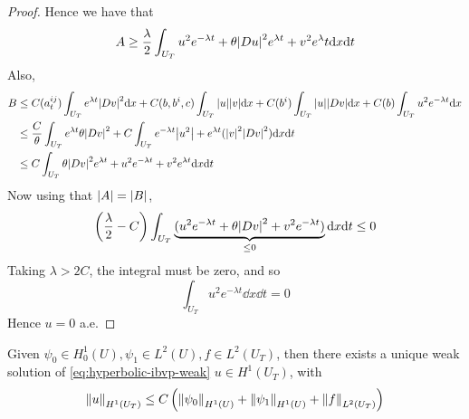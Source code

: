 \documentclass{article}
\begin{document}
\begin{proof}
    Hence we have that
    \[A \ge \frac{\lambda}{2}\int_{U_T}u^2e^{-\lambda t} + \theta \abs{Du}^2 e^{\lambda t} + v^2e^\lambda t \dd x \dd t\]
    Also,
    \begin{align*}
        B &\le C(a^{ij}_t)\int_{U_T}e^{\lambda t}\abs{Dv}^2\dd x + C(b, b^i, c)\int_{U_T}\abs{u}\abs{v}\dd x + C(b^i)\int_{U_T}\abs{u}\abs{Dv}\dd x + C(b)\int_{U_T}u^2e^{-\lambda t} \dd x \\
        &\le \frac{C}{\theta}\int_{U_T}e^{\lambda t}\theta\abs{Dv}^2 + C\int_{U_T}e^{-\lambda t}\abs{u^2} + e^{\lambda t}(\abs{v}^2 \abs{Dv}^2) \dd x \dd t \\
        &\le C \int_{U_T}\theta \abs{Dv}^2 e^{\lambda t} + u^2 e^{-\lambda t} + v^2 e^{\lambda t} \dd x \dd t
    \end{align*}
    Now using that \(\abs{A} = \abs{B}\),
    \[\left(\frac{\lambda}{2} - C\right)\int_{U_T}\underbrace{(u^2 e^{-\lambda t} + \theta\abs{Dv}^2 + v^2e^{-\lambda t})}_{\le 0}\dd x \dd t \le 0\]
    Taking \(\lambda > 2C\), the integral must be zero, and so
    \[\int_{U_T}u^2 e^{-\lambda t}\dd x\dd t = 0\]
    Hence \(u = 0\) a.e.
\end{proof}

\lec

\begin{theorem}
    Given \(\psi_0 \in H^1_0(U), \psi_1 \in L^2(U), f \in L^2(U_T)\), then there exists a unique weak solution of \cref{eq:hyperbolic-ibvp-weak} \(u \in H^1(U_T)\), with
    \[\norm{u}_{H^1(U_T)} \le C\left(\norm{\psi_0}_{H^1(U)} + \norm{\psi_1}_{H^1(U)} + \norm{f}_{L^2(U_T)}\right)\]
\end{theorem}
\end{document}
